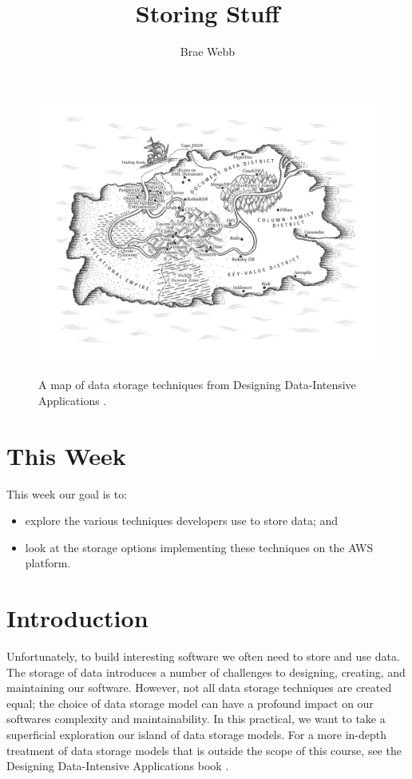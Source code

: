 \documentclass{csse4400}
\title{Storing Stuff}
\author{Brae Webb}
\date{\week{3}}
\begin{document}
\maketitle

\begin{figure}[h]
  \href{https://www.oreilly.com/library/view/designing-data-intensive-applications/9781491903063/ch02.html}{
    \includegraphics[width=\textwidth]{images/databases}
  }
\caption{A map of data storage techniques from Designing Data-Intensive Applications \cite{data-intensive}.}
\end{figure}

\section{This Week}
This week our goal is to:
\begin{itemize}
  \item explore the various techniques developers use to store data; and
  \item look at the storage options implementing these techniques on the AWS platform.
\end{itemize}

\section{Introduction}
Unfortunately, to build interesting software we often need to store and use data.
The storage of data introduces a number of challenges to designing, creating, and maintaining our software.
However, not all data storage techniques are created equal;
the choice of data storage model can have a profound impact on our softwares complexity and maintainability.
In this practical, we want to take a superficial exploration our island of data storage models.
For a more in-depth treatment of data storage models that is outside the scope of this course,
see the Designing Data-Intensive Applications book \cite{data-intensive}.
\end{document}
